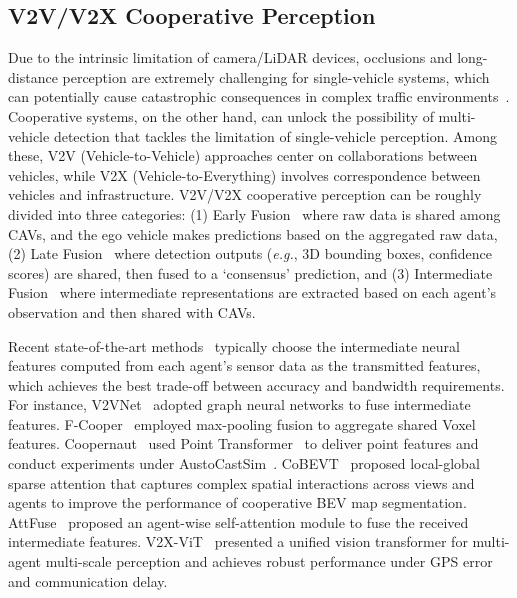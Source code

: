 \documentclass[10pt,twocolumn,letterpaper]{article}
\begin{document}
\subsection{V2V/V2X Cooperative Perception}
\label{sec:2.3}
Due to the intrinsic limitation of camera/LiDAR devices, occlusions and long-distance perception are extremely challenging for single-vehicle systems, which can potentially cause catastrophic consequences in complex traffic environments~\cite {xu2022opv2v}.
Cooperative systems, on the other hand, can unlock the possibility of multi-vehicle detection that tackles the limitation of single-vehicle perception.
Among these, V2V (Vehicle-to-Vehicle) approaches center on collaborations between vehicles, while V2X (Vehicle-to-Everything) involves correspondence between vehicles and infrastructure.
V2V/V2X cooperative perception can be roughly divided into three categories: (1) {Early Fusion}~\cite{chen2019cooper} where raw data is shared among CAVs, and the ego vehicle makes predictions based on the aggregated raw data, (2) {Late Fusion}~\cite{rawashdeh2018collaborative} where detection outputs (\textit{e.g.}, 3D bounding boxes, confidence scores) are shared, then fused to a `consensus' prediction, and (3) {Intermediate Fusion}~\cite{wang2020v2vnet,chen2019f,xu2022opv2v,lu2022robust} where intermediate representations are extracted based on each agent’s observation and then shared with CAVs.

Recent state-of-the-art methods~\cite{wang2020v2vnet,chen2019f,xu2022opv2v} typically choose the intermediate neural features computed from each agent's sensor data as the transmitted features, which achieves the best trade-off between accuracy and bandwidth requirements.
For instance, V2VNet~\cite{wang2020v2vnet} adopted graph neural networks to fuse intermediate features.
F-Cooper~\cite{chen2019f} employed max-pooling fusion to aggregate shared Voxel features. Coopernaut~\cite{cui2022coopernaut} used Point Transformer~\cite{zhao2021point} to deliver point features and conduct experiments under AustoCastSim~\cite{autocast}.
CoBEVT~\cite{xu2022cobevt} proposed local-global sparse attention that captures complex spatial interactions across views and agents to improve the performance of cooperative BEV map segmentation. AttFuse~\cite{xu2022opv2v} proposed an agent-wise self-attention module to fuse the received intermediate features.
V2X-ViT~\cite{xu2022v2xvit} presented a unified vision transformer for multi-agent multi-scale perception and achieves robust performance under GPS error and communication delay. 
\end{document}
